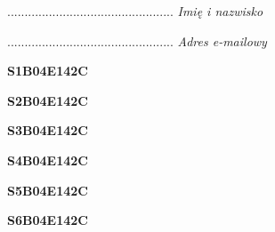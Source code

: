 \begin{turn}{90}\begin{minipage}{\linewidth} \vspace{20mm} ................................................  \textit{Imię i nazwisko}\end{minipage}\end{turn}

\begin{turn}{90}\begin{minipage}{\linewidth} \vspace{20mm} ................................................  \textit{Adres e-mailowy}\end{minipage}\end{turn}

\begin{turn}{90}\huge \begin{minipage}{\linewidth} \vspace{10mm}\textbf{S1B04E142C}\end{minipage}\end{turn}

\begin{turn}{90}\huge \begin{minipage}{\linewidth} \vspace{10mm}\textbf{S2B04E142C}\end{minipage}\end{turn}

\begin{turn}{90}\huge \begin{minipage}{\linewidth} \vspace{10mm}\textbf{S3B04E142C}\end{minipage}\end{turn}

\begin{turn}{90}\huge \begin{minipage}{\linewidth} \vspace{10mm}\textbf{S4B04E142C}\end{minipage}\end{turn}

\begin{turn}{90}\huge \begin{minipage}{\linewidth} \vspace{10mm}\textbf{S5B04E142C}\end{minipage}\end{turn}

\begin{turn}{90}\huge \begin{minipage}{\linewidth} \vspace{10mm}\textbf{S6B04E142C}\end{minipage}\end{turn}

